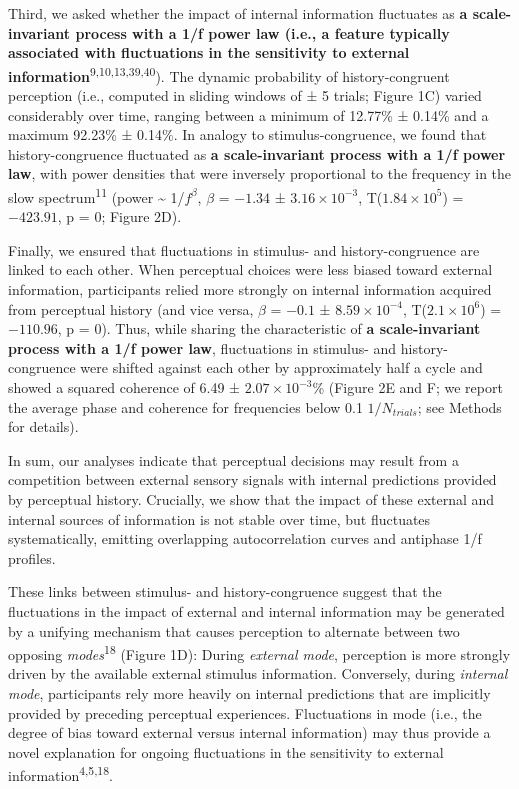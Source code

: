 \documentclass[
]{article}
\begin{document}
Third, we asked whether the impact of internal information fluctuates as
\textbf{a scale-invariant process with a 1/f power law (i.e., a feature
typically associated with fluctuations in the sensitivity to external
information}\textsuperscript{9,10,13,39,40}). The dynamic probability of
history-congruent perception (i.e., computed in sliding windows of ± 5
trials; Figure 1C) varied considerably over time, ranging between a
minimum of 12.77\% ± 0.14\% and a maximum 92.23\% ± 0.14\%. In analogy
to stimulus-congruence, we found that history-congruence fluctuated as
\textbf{a scale-invariant process with a 1/f power law}, with power
densities that were inversely proportional to the frequency in the slow
spectrum\textsuperscript{11} (power \textasciitilde{} 1/\(f^\beta\),
\(\beta\) = \(-1.34\) ± \(\ensuremath{3.16\times 10^{-3}}\),
T(\(\ensuremath{1.84\times 10^{5}}\)) = \(-423.91\), p = \(0\); Figure
2D).

Finally, we ensured that fluctuations in stimulus- and
history-congruence are linked to each other. When perceptual choices
were less biased toward external information, participants relied more
strongly on internal information acquired from perceptual history (and
vice versa, \(\beta\) = \(-0.1\) ± \(\ensuremath{8.59\times 10^{-4}}\),
T(\(\ensuremath{2.1\times 10^{6}}\)) = \(-110.96\), p = \(0\)). Thus,
while sharing the characteristic of \textbf{a scale-invariant process
with a 1/f power law}, fluctuations in stimulus- and history-congruence
were shifted against each other by approximately half a cycle and showed
a squared coherence of 6.49 ± \ensuremath{2.07\times 10^{-3}}\% (Figure
2E and F; we report the average phase and coherence for frequencies
below 0.1 \(1/N_{trials}\); see Methods for details).

In sum, our analyses indicate that perceptual decisions may result from
a competition between external sensory signals with internal predictions
provided by perceptual history. Crucially, we show that the impact of
these external and internal sources of information is not stable over
time, but fluctuates systematically, emitting overlapping
autocorrelation curves and antiphase 1/f profiles.

These links between stimulus- and history-congruence suggest that the
fluctuations in the impact of external and internal information may be
generated by a unifying mechanism that causes perception to alternate
between two opposing \emph{modes}\textsuperscript{18} (Figure 1D):
During \emph{external mode}, perception is more strongly driven by the
available external stimulus information. Conversely, during
\emph{internal mode}, participants rely more heavily on internal
predictions that are implicitly provided by preceding perceptual
experiences. Fluctuations in mode (i.e., the degree of bias toward
external versus internal information) may thus provide a novel
explanation for ongoing fluctuations in the sensitivity to external
information\textsuperscript{4,5,18}.
\end{document}

